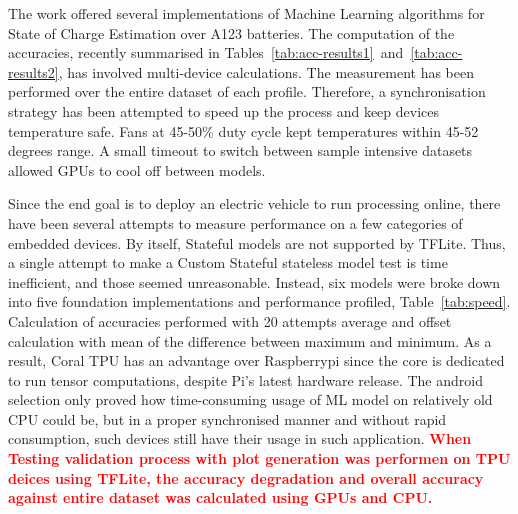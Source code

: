 The work offered several implementations of Machine Learning algorithms for State of Charge Estimation over A123 batteries.
The computation of the accuracies, recently summarised in \mbox{Tables~\ref{tab:acc-results1} and~\ref{tab:acc-results2}}, has involved multi-device calculations.
The measurement has been performed over the entire dataset of each profile.
Therefore, a synchronisation strategy has been attempted to speed up the process and keep devices temperature safe.
Fans at 45-50\% duty cycle kept temperatures within 45-52 degrees range.
A small timeout to switch between sample intensive datasets allowed GPUs to cool off between models.

%
%
Since the end goal is to deploy an electric vehicle to run processing online, there have been several attempts to measure performance on a few categories of embedded devices.
By itself, Stateful models are not supported by TFLite.
Thus, a single attempt to make a Custom Stateful stateless model test is time inefficient, and those seemed unreasonable.
Instead, six models were broke down into five foundation implementations and performance profiled, \mbox{Table~\ref{tab:speed}}.
Calculation of accuracies performed with 20 attempts average and offset calculation with mean of the difference between maximum and minimum.
As a result, Coral TPU has an advantage over Raspberrypi since the core is dedicated to run tensor computations, despite Pi's latest hardware release.
The android selection only proved how time-consuming usage of ML model on relatively old CPU could be, but in a proper synchronised manner and without rapid consumption, such devices still have their usage in such application.
\textcolor{red}{\textbf{When Testing validation process  with plot generation was performen on TPU deices using TFLite, the accuracy degradation and overall accuracy against entire dataset was calculated using GPUs and CPU.}}

